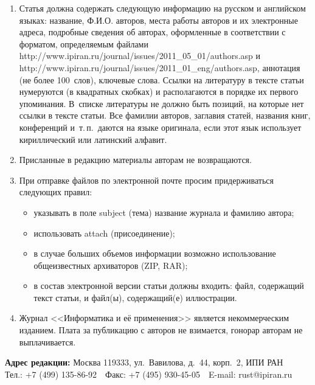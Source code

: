 {{\begin{enumerate}
пронумерованы. %
\item Статья должна содержать следующую информацию на русском и
английском языках: название, Ф.И.О. авторов, места работы авторов и их
электронные адреса, подробные сведения об авторах, оформленные в соответствии с форматом, 
определяемым файлами {\sf http://www.ipiran.ru/journal/issues/2011\_05\_01/authors.asp} и 
{\sf http://www.ipiran.ru/journal/issues/2011\_01\_eng/authors.asp},
аннотация (не более 100~слов), ключевые слова. Ссылки на
литературу в тексте статьи нумеруются (в квадратных скобках) и располагаются в
порядке их первого упоминания. В~списке литературы не должно быть позиций, на которые нет ссылки в тексте статьи.
Все фамилии авторов, заглавия статей, названия
книг, конференций и~т.\,п.\ даются на языке оригинала, если этот язык
использует кириллический или латинский алфавит. %
\item Присланные в редакцию материалы авторам не возвращаются.
\item При отправке файлов по электронной
почте просим придерживаться следующих правил:
\begin{itemize}
\item указывать в поле subject (тема) название журнала и фамилию автора; %
\item использовать attach (присоединение); %
\item в случае больших объемов информации возможно
использование общеизвестных архиваторов (ZIP, RAR); %
\item в состав электронной версии статьи должны входить: файл, содержащий текст статьи, и файл(ы),
содержащий(е) иллюстрации. %
\end{itemize}
\item Журнал <<Информатика и её применения>> является некоммерческим изданием. 
Плата за публикацию с авторов не взимается, гонорар авторам не выплачивается.
\end{enumerate}
\thispagestyle{empty}
\textbf{Адрес редакции:} Москва 119333,
ул.~Вавилова, д.~44, корп.~2, ИПИ РАН\\
Тел.: +7 (499) 135-86-92\ \
Факс:  +7 (495) 930-45-05\ \  E-mail:   rust@ipiran.ru }
}